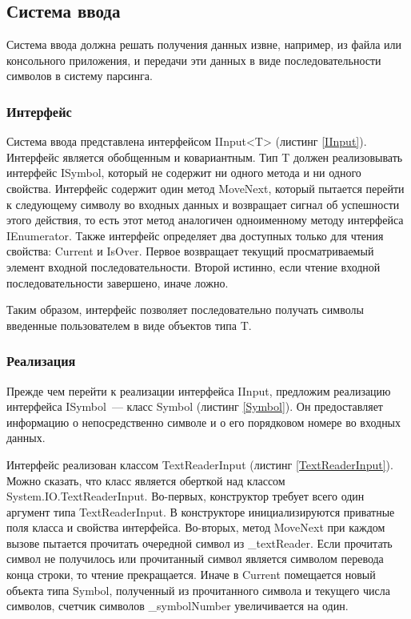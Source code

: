 \subsection{Система ввода}

Система ввода должна решать получения данных извне, например, из файла или консольного приложения, и передачи эти данных в виде последовательности символов в систему парсинга.

\subsubsection{Интерфейс}

Система ввода представлена интерфейсом IInput<T> (листинг \ref{IInput}). Интерфейс является обобщенным и ковариантным. Тип T должен реализовывать интерфейс ISymbol, который не содержит ни одного метода и ни одного свойства. Интерфейс содержит один метод MoveNext, который пытается перейти к следующему символу во входных данных и возвращает сигнал об успешности этого действия, то есть этот метод аналогичен одноименному методу интерфейса IEnumerator. Также интерфейс определяет два доступных только для чтения свойства: Current и IsOver. Первое возвращает текущий просматриваемый элемент входной последовательности. Второй истинно, если чтение входной последовательности завершено, иначе ложно.

Таким образом, интерфейс позволяет последовательно получать символы введенные пользователем в виде объектов типа T.



\subsubsection{Реализация}

Прежде чем перейти к реализации интерфейса IInput, предложим реализацию интерфейса ISymbol~--- класс Symbol (листинг \ref{Symbol}). Он предоставляет информацию о непосредственно символе и о его порядковом номере во входных данных.



Интерфейс реализован классом TextReaderInput (листинг \ref{TextReaderInput}). Можно сказать, что класс является оберткой над классом System.IO.TextReaderInput. Во-первых, конструктор требует всего один аргумент типа TextReaderInput. В конструкторе инициализируются приватные поля класса и свойства интерфейса. Во-вторых, метод MoveNext при каждом вызове пытается прочитать очередной символ из \_textReader. Если прочитать символ не получилось или прочитанный символ является символом перевода конца строки, то чтение прекращается. Иначе в Current помещается новый объекта типа Symbol, полученный из прочитанного символа и текущего числа символов, счетчик символов \_symbolNumber увеличивается на один.

